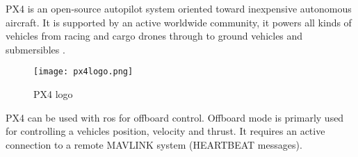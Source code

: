 
PX4 is an open-source autopilot system oriented toward inexpensive autonomous aircraft. 
It is supported by an active worldwide community, it powers all kinds of vehicles from racing and 
cargo drones through to ground vehicles and submersibles \cite{px4:docs}.

\begin{figure}[ht]
    \centering
    \texttt{[image: px4logo.png]}
    \caption[PX4 logo]{PX4 logo}
\end{figure}

PX4 can be used with \acs{ros} for offboard control. Offboard mode is primarly used for controlling a vehicles position, velocity and thrust.
It requires an active connection to a remote MAVLINK system (HEARTBEAT messages).